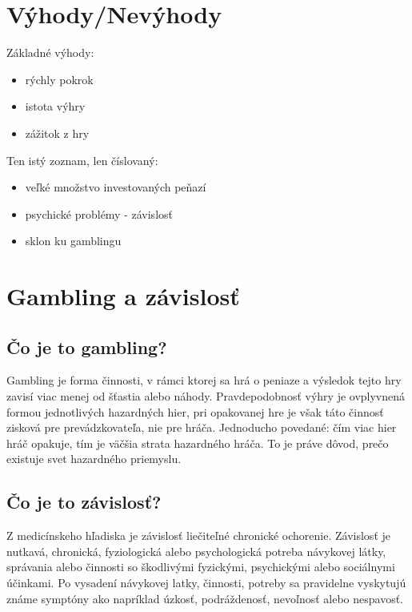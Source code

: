 \documentclass[10pt,twoside,slovak,a4paper]{article}
\begin{document}
\section{Výhody/Nevýhody} \label{3}


Základné výhody:

\begin{itemize}
\item rýchly pokrok
\item istota výhry
\item zážitok z hry 
\end{itemize}

Ten istý zoznam, len číslovaný:

\begin{itemize}
\item veľké množstvo investovaných peňazí
\item psychické problémy - závislosť
\item sklon ku gamblingu
\end{itemize}


\section{Gambling a závislosť} 

\subsection{Čo je to gambling?}
Gambling je forma činnosti, v rámci ktorej sa hrá o peniaze a výsledok tejto hry zavisí viac menej od šťastia alebo náhody. Pravdepodobnosť výhry je ovplyvnená formou jednotlivých hazardných hier, pri opakovanej hre je však táto činnosť zisková pre prevádzkovateľa, nie pre hráča. Jednoducho povedané: čím viac hier hráč opakuje, tím je väčšia strata hazardného hráča. To je práve dôvod, prečo existuje svet hazardného priemyslu.

\subsection{Čo je to závislosť?}
Z medicínskeho hľadiska je závislosť liečiteľné chronické ochorenie. Závislosť je nutkavá, chronická, fyziologická alebo psychologická potreba návykovej látky, správania alebo činnosti so škodlivými fyzickými, psychickými alebo sociálnymi účinkami. Po vysadení návykovej latky, činnosti, potreby sa pravidelne vyskytujú známe symptóny ako napríklad úzkosť, podráždenosť, nevoľnosť alebo nespavosť.\cite{4}
\end{document}
